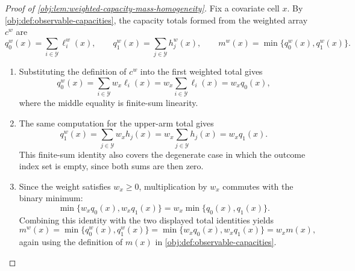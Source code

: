 \begin{proof}[Proof of \cref{obj:lem:weighted-capacity-mass-homogeneity}]
Fix a covariate cell \(x\).  By \cref{obj:def:observable-capacities}, the capacity totals formed from the weighted array \(c^w\) are
\[
q_0^w(x)=\sum_{i\in\mathcal Y}\ell_i^w(x),
\qquad
q_1^w(x)=\sum_{j\in\mathcal Y}h_j^w(x),
\qquad
m^w(x)=\min\{q_0^w(x),q_1^w(x)\}.
\]

\begin{enumerate}
\item Substituting the definition of \(c^w\) into the first weighted total gives
\[
q_0^w(x)
=\sum_{i\in\mathcal Y} w_x\ell_i(x)
=w_x\sum_{i\in\mathcal Y}\ell_i(x)
=w_x q_0(x),
\]
where the middle equality is finite-sum linearity. %

\item The same computation for the upper-arm total gives
\[
q_1^w(x)
=\sum_{j\in\mathcal Y} w_xh_j(x)
=w_x\sum_{j\in\mathcal Y}h_j(x)
=w_x q_1(x).
\]
This finite-sum identity also covers the degenerate case in which the outcome index set is empty, since both sums are then zero. %

\item Since the weight satisfies \(w_x\ge 0\), multiplication by \(w_x\) commutes with the binary minimum:
\[
\min\{w_xq_0(x),w_xq_1(x)\}
=
w_x\min\{q_0(x),q_1(x)\}.
\]
Combining this identity with the two displayed total identities yields
\[
m^w(x)
=\min\{q_0^w(x),q_1^w(x)\}
=\min\{w_xq_0(x),w_xq_1(x)\}
=w_xm(x),
\]
again using the definition of \(m(x)\) in \cref{obj:def:observable-capacities}. %
\end{enumerate}
\end{proof}
